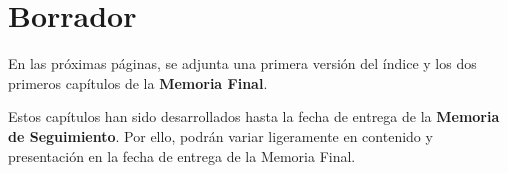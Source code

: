 \section{Borrador} \label{chapters:borrador:sections:borrador}

En las próximas páginas, se adjunta una primera versión del índice y los dos primeros capítulos de la \textbf{Memoria Final}.

Estos capítulos han sido desarrollados hasta la fecha de entrega de la \textbf{Memoria de Seguimiento}. Por ello, podrán variar ligeramente en contenido y presentación en la fecha de entrega de la Memoria Final.

\clearpage
